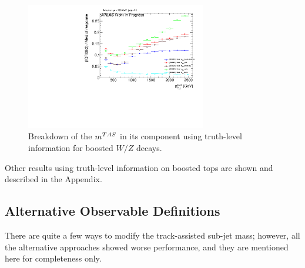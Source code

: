 \begin{figure}[!ht]
  \centering
      \includegraphics[width=0.7\textwidth]{jet_part/calib/71graphcftr_h_JetRatio_mJ12CALOIQRoM4Truths.pdf}
  \caption[Breakdown of the $\mtas$ ]{Breakdown of the $\mtas$ in its component using truth-level information for boosted $W/Z$ decays.}
  \label{fig:breakdown2}
\end{figure}

Other results using truth-level information on boosted tops are shown and described in the Appendix.


% 


\subsection{Alternative Observable Definitions}
\label{sec:alternate}

There are quite a few ways to modify the track-assisted sub-jet mass; however, all the alternative approaches showed worse performance, and they are mentioned here for completeness only.

